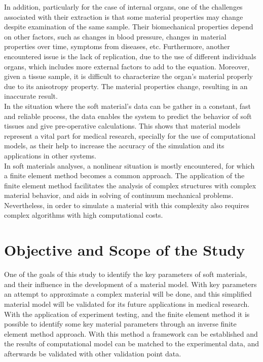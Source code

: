 In addition, particularly for the case of internal organs, one of the challenges associated with their extraction 
is that some material properties may change despite examination of the same sample. Their biomechanical properties 
depend on other factors, such as changes in blood pressure, changes in material properties 
over time, symptoms from diseases, etc. Furthermore, another encountered issue is the lack 
of replication, due to the use of different individuals organs, which includes more external
 factors to add to the equation. Moreover, given a tissue sample, it is difficult to 
 characterize the organ's material properly due to its anisotropy property. The material 
 properties change, resulting in an inaccurate result.
\\

In the situation where the soft material's data can be gather in a constant, fast and reliable
process, the data enables the system to predict the behavior of soft tissues and give pre-operative
 calculations. This shows that material models represent a vital part for medical research, 
 specially for the use of computational models, as their help to increase the accuracy of the 
 simulation and its applications in other systems.\\

In soft materials analyses, a nonlinear situation is mostly encountered, for which a finite 
element method becomes a common approach. The application of the finite element method
 facilitates the analysis of complex structures with complex material behavior, and aids in 
 solving of continuum mechanical problems. Nevertheless, in order to simulate a material with 
 this complexity also requires complex algorithms with high computational costs. \\

 \section{Objective and Scope of the Study} 
One of the goals of this study to identify the key parameters of soft materials, and their 
influence in the development of a material model. With key parameters an attempt to 
 approximate a complex material will be done, and this simplified material model will be 
 validated for its future applications in medical research.\\
 
 With the application of experiment testing, and the finite element method it is possible 
 to identify some key material parameters through an inverse finite element method approach. With this 
 method a framework can be established and the results of computational model can be matched 
 to the experimental data, and afterwards be validated with other validation point data.

